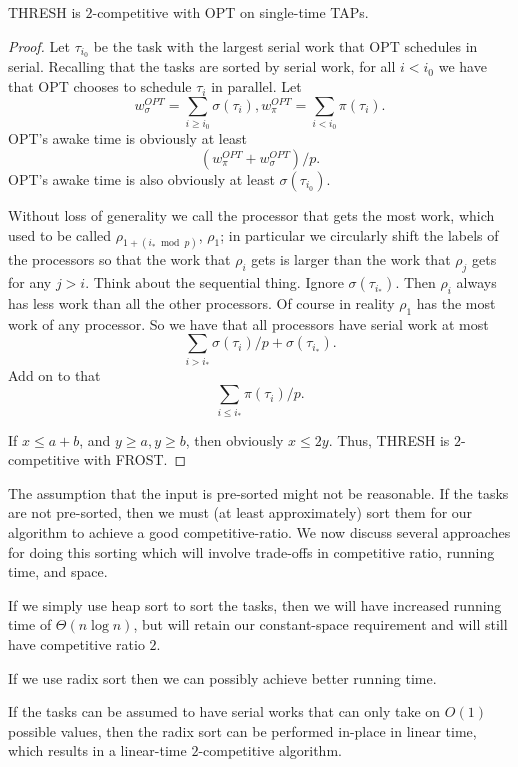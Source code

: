 \begin{proposition}
THRESH is $2$-competitive with OPT on single-time TAPs.
\end{proposition}
\begin{proof}
Let $\tau_{i_0}$ be the task with the largest serial work that
OPT schedules in serial. Recalling that the tasks are sorted by
serial work, for all $i < i_0$ we have that OPT chooses to
schedule $\tau_i$ in parallel. Let $$w^{OPT}_\sigma = \sum_{i \ge
i_0} \sigma(\tau_i), w^{OPT}_\pi = \sum_{i < i_0} \pi(\tau_i).$$
OPT's awake time is obviously at least $$(w^{OPT}_\pi +
w^{OPT}_\sigma)/p.$$ OPT's awake time is also obviously at least
$\sigma(\tau_{i_0})$.

Without loss of generality we call the processor that gets the
most work, which used to be called $\rho_{1+(i_* \bmod p)}$,
$\rho_1$; in particular we circularly shift the labels of the
processors so that the work that $\rho_i$ gets is larger than the
work that $\rho_j$ gets for any $j > i$.
Think about the sequential thing.
Ignore $\sigma(\tau_{i_*})$. Then $\rho_i$ always has less work
than all the other processors. Of course in reality $\rho_1$ has
the most work of any processor.
So we have that all processors have serial work at most 
$$\sum_{i > i_*} \sigma(\tau_i)/p + \sigma(\tau_{i_*}).$$
Add on to that $$\sum_{i \le i_*} \pi(\tau_i)/p.$$

If $x \le a + b$, and $y \ge a, y \ge b$, then obviously $x \le
2y$. Thus, THRESH is $2$-competitive with FROST. 
\end{proof}

The assumption that the input is pre-sorted might not be
reasonable. If the tasks are not pre-sorted, then we must (at
least approximately) sort them for our algorithm to achieve a
good competitive-ratio. We now discuss several approaches for
doing this sorting which will involve trade-offs in competitive
ratio, running time, and space.

If we simply use heap sort to sort the tasks, then we
will have increased running time of $\Theta(n \log n)$, but will
retain our constant-space requirement and will still have
competitive ratio $2$.

If we use radix sort then we can possibly achieve better
running time. 

If the tasks can be assumed to
have serial works that can only take on $O(1)$ possible
values, then the radix sort can be performed in-place in linear
time, which results in a linear-time $2$-competitive algorithm. 

